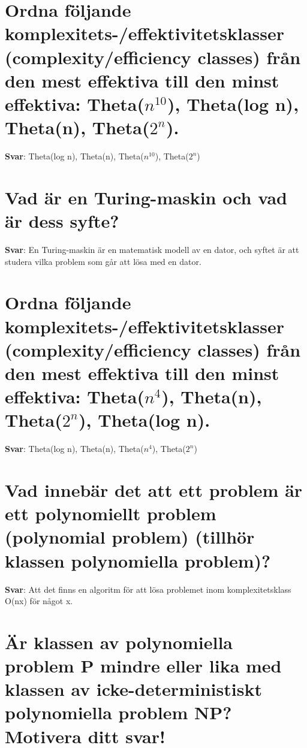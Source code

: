 \documentclass[a4paper,11pt,oneside]{book}
\begin{document}
\begin{sloppypar}
\section{Ordna f\"oljande komplexitets-/effektivitetsklasser (complexity/efficiency classes) fr\r{a}n den mest effektiva till den minst effektiva: Theta($n^10$), Theta(log n), Theta(n), Theta($2^n$).}

\label{q:332:sa:sv:True}

\textbf{Svar}: Theta(log n), Theta(n), Theta($n^10$), Theta($2^n$)



\section{Vad \"ar en Turing-maskin och vad \"ar dess syfte?}

\label{q:333:sa:sv:True}

\textbf{Svar}: En Turing-maskin \"ar en matematisk modell av en dator, och syftet \"ar att studera vilka problem som g\r{a}r att l\"osa med en dator.



\section{Ordna f\"oljande komplexitets-/effektivitetsklasser (complexity/efficiency classes) fr\r{a}n den mest effektiva till den minst effektiva: Theta($n^4$), Theta(n), Theta($2^n$), Theta(log n).}

\label{q:334:sa:sv:True}

\textbf{Svar}: Theta(log n), Theta(n), Theta($n^4$), Theta($2^n$)



\section{Vad inneb\"ar det att ett problem \"ar ett polynomiellt problem (polynomial problem) (tillh\"or klassen polynomiella problem)?}

\label{q:335:sa:sv:True}

\textbf{Svar}: Att det finns en algoritm f\"or att l\"osa problemet inom komplexitetsklass O(nx) f\"or n\r{a}got x.



\section{\"Ar klassen av polynomiella problem P mindre eller lika med klassen av icke-deterministiskt polynomiella problem NP? Motivera ditt svar!}


\end{sloppypar}
\end{document}
